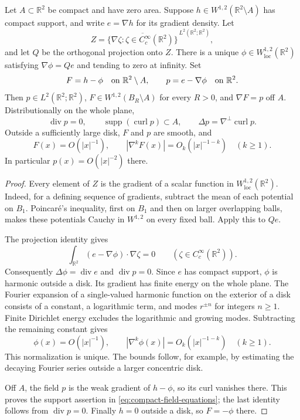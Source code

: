 \begin{lemma}
\label{lem:compact-projection}
Let $A\subset\mathbb R^2$ be compact and have zero area. Suppose
$h\in W^{1,2}(\mathbb R^2\setminus A)$ has compact support, and write
$e=\nabla h$ for its gradient density. Let
\[
 Z=\overline{\{\nabla\zeta:\zeta\in C_c^\infty(\mathbb R^2)\}}
       ^{\,L^2(\mathbb R^2;\mathbb R^2)},
\]
and let $Q$ be the orthogonal projection onto $Z$. There is a unique
$\phi\in W^{1,2}_{\mathrm{loc}}(\mathbb R^2)$ satisfying
$\nabla\phi=Qe$ and tending to zero at infinity. Set
\[
 F=h-\phi\quad\hbox{on }\mathbb R^2\setminus A,
 \qquad p=e-\nabla\phi\quad\hbox{on }\mathbb R^2.
\]
Then $p\in L^2(\mathbb R^2;\mathbb R^2)$,
$F\in W^{1,2}(B_R\setminus A)$ for every $R>0$,
and $\nabla F=p$ off $A$. Distributionally on the whole plane,
\begin{equation}
 \operatorname{div}p=0,\qquad
 \operatorname{supp}(\operatorname{curl}p)\subset A,\qquad
 \Delta p=\nabla^\perp\operatorname{curl}p.
 \label{eq:compact-field-equations}
\end{equation}
Outside a sufficiently large disk, $F$ and $p$ are smooth, and
\begin{equation}
 F(x)=O(|x|^{-1}),\qquad
 |\nabla^k F(x)|=O_k(|x|^{-1-k})\quad(k\geq1).
 \label{eq:compact-field-decay}
\end{equation}
In particular $p(x)=O(|x|^{-2})$ there.
\end{lemma}

\begin{proof}
Every element of $Z$ is the gradient of a scalar function in
$W^{1,2}_{\mathrm{loc}}(\mathbb R^2)$. Indeed, for a defining sequence
of gradients, subtract the mean of each potential on $B_1$. Poincar\'e's
inequality, first on $B_1$ and then on larger overlapping balls, makes these
potentials Cauchy in $W^{1,2}$ on every fixed ball. Apply this to $Qe$.

The projection identity gives
\[
 \int_{\mathbb R^2}(e-\nabla\phi)\cdot\nabla\zeta=0
       \qquad(\zeta\in C_c^\infty(\mathbb R^2)).
\]
Consequently $\Delta\phi=\operatorname{div}e$ and
$\operatorname{div}p=0$. Since $e$ has compact support, $\phi$ is harmonic
outside a disk. Its gradient has finite energy on the whole plane.
The Fourier expansion of a single-valued harmonic function on the exterior
of a disk consists of a constant, a logarithmic term, and modes $r^{\pm n}$
for integers $n\geq1$. Finite Dirichlet energy excludes the logarithmic and
growing modes. Subtracting the remaining constant gives
\[
 \phi(x)=O(|x|^{-1}),\qquad
 |\nabla^k\phi(x)|=O_k(|x|^{-1-k})\quad(k\geq1).
\]
This normalization is unique. The bounds follow, for example, by estimating
the decaying Fourier series outside a larger concentric disk.

Off $A$, the field $p$ is the weak gradient of $h-\phi$, so its curl
vanishes there. This proves the support assertion in
\eqref{eq:compact-field-equations}; the last identity follows from
$\operatorname{div}p=0$. Finally $h=0$ outside a disk, so $F=-\phi$ there.
\end{proof}


